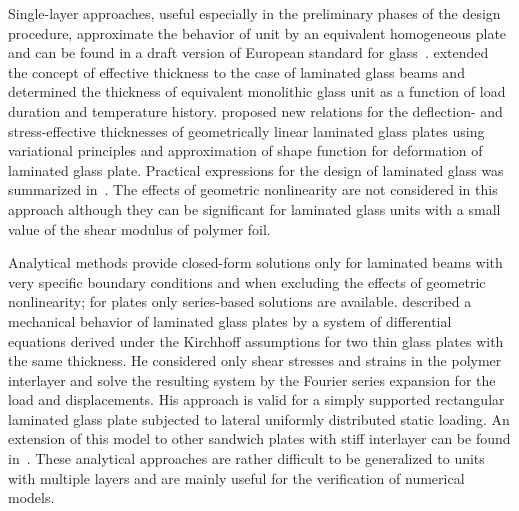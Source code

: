 \documentclass[11pt]{article}
\begin{document}
Single-layer approaches, useful especially in the preliminary phases of the design procedure, approximate the behavior of unit by an equivalent homogeneous plate and can be found in a draft version of European standard for glass~\cite{prEN16612}. \cite{Benninson:2008:HPLG} extended the concept of effective thickness to the case of laminated glass beams and determined the thickness of equivalent monolithic glass unit as a function of load duration and temperature history. 
\cite{Galuppi:2012:ETLGP} proposed new relations for the deflection- and stress-effective thicknesses of geometrically linear laminated glass plates using variational principles and approximation of shape function for deformation of laminated glass plate. Practical expressions for the design of laminated glass was summarized in~\cite{Galuppi:2012:PEFD}. The effects of geometric nonlinearity are not considered in this approach although they can be significant for laminated glass units with a small value of the shear modulus of polymer foil. 

Analytical methods provide closed-form solutions only for laminated beams with very specific boundary conditions and when excluding the effects of geometric nonlinearity; for plates only series-based solutions are available.
\cite{Foraboschi:2012:AMLGP} described a mechanical behavior of laminated glass plates by a system of differential equations derived under the Kirchhoff assumptions for two thin glass plates with the same thickness. He considered only shear stresses and strains in the polymer interlayer and solve the resulting system by the Fourier series expansion for the load and displacements. His approach is valid for a simply supported rectangular laminated glass plate subjected to lateral uniformly distributed static loading. An extension of this model to other sandwich plates with stiff interlayer can be found in~\cite{Foraboschi:2013:TLPES}.
These analytical approaches are rather difficult to be generalized to units with multiple layers and are mainly useful for the verification of numerical models. 
\end{document}
